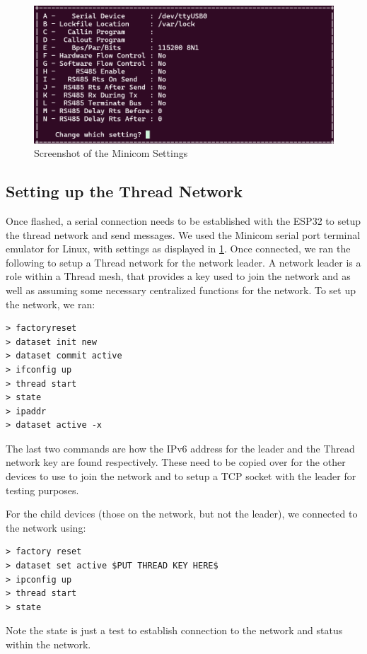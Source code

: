 \documentclass[letterpaper,twocolumn,10pt]{article}
\begin{document}
\begin{figure}
    \centering
    \includegraphics[width=0.75\linewidth]{Figures/minicom_screenshot.png}
    \caption{Screenshot of the Minicom Settings}
    \label{fig:minicom}
\end{figure}

\subsection{Setting up the Thread Network}

Once flashed, a serial connection needs to be established with the ESP32 to setup the thread network and send messages. We used the Minicom serial port terminal emulator for Linux, with settings as displayed in \ref{fig:minicom}. Once connected, we ran the following to setup a Thread network for the network leader. A network leader is a role within a Thread mesh, that provides a key used to join the network and as well as assuming some necessary centralized functions for the network. To set up the network, we ran:
\begin{verbatim}
> factoryreset
> dataset init new
> dataset commit active
> ifconfig up
> thread start 
> state
> ipaddr
> dataset active -x
\end{verbatim}

The last two commands are how the IPv6 address for the leader and the Thread network key are found respectively. These need to be copied over for the other devices to use to join the network and to setup a TCP socket with the leader for testing purposes.

For the child devices (those on the network, but not the leader), we connected to the network using:

\begin{verbatim}
> factory reset
> dataset set active $PUT THREAD KEY HERE$
> ipconfig up
> thread start
> state
\end{verbatim}

Note the state is just a test to establish connection to the network and status within the network.
\end{document}

